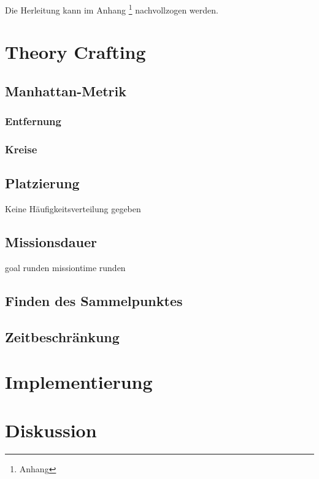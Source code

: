 \documentclass{article}
\begin{document}
Die Herleitung kann im Anhang \footnote{Anhang} nachvollzogen werden.

\clearpage
\section{Theory Crafting}

\subsection{Manhattan-Metrik}
\label{sec:manhattan}

\subsubsection{Entfernung}


\subsubsection{Kreise}


\subsection{Platzierung}

Keine Häufigkeitsverteilung gegeben

\subsection{Missionsdauer}

goal runden
missiontime runden

\subsection{Finden des Sammelpunktes}

\subsection{Zeitbeschränkung}

\clearpage
\section{Implementierung}


\clearpage
\section{Diskussion}
\end{document}
